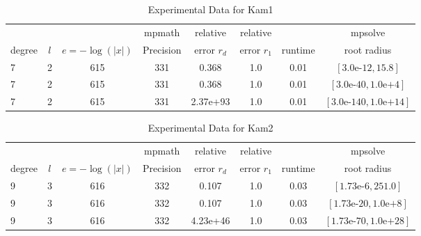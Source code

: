 \documentclass[sigconf]{acmart}
\begin{document}
\begin{table}[t]
\caption{Experimental Data for Kam1}
\label{tab:kam1}
\vskip -0.15in
\begin{center}
\begin{small}
\begin{sc}
\begin{tabular}{lccccccc}
\toprule
&  &  & mpmath & relative  & relative &  & mpsolve \\
degree  & $l$& $e=-\log(|x|)$& Precision &error $r_d$       & error $r_1$ &runtime& root radius\\
\midrule
 7 & 2 & 615 & 331 & 0.368 & 1.0 & 0.01 & $[3.0\text{e-}12, 15.8]$\\
 7 & 2 & 615 & 331 & 0.368 & 1.0 & 0.01 & $[3.0\text{e-}40, 1.0\text{e+}4]$\\
 7 & 2 & 615 & 331 & 2.37e+93 & 1.0 & 0.01 & $[3.0\text{e-}140, 1.0\text{e+}14]$\\
\bottomrule
\end{tabular}
\end{sc}
\end{small}
\end{center}
\vskip 0.05in
\end{table}

\begin{table}[t]
\caption{Experimental Data for Kam2}
\label{tab:kam2}
\vskip -0.15in
\begin{center}
\begin{small}
\begin{sc}
\begin{tabular}{lccccccc}
\toprule
&  &  & mpmath & relative  & relative &  & mpsolve \\
degree  & $l$& $e=-\log(|x|)$& Precision &error $r_d$       & error $r_1$ &runtime& root radius\\
\midrule
 9 & 3 & 616 & 332 & 0.107 & 1.0 & 0.03 & $[1.73\text{e-}6, 251.0]$\\
 9 & 3 & 616 & 332 & 0.107 & 1.0 & 0.03 & $[1.73\text{e-}20, 1.0\text{e+}8]$\\
 9 & 3 & 616 & 332 & 4.23e+46 & 1.0 & 0.03 & $[1.73\text{e-}70, 1.0\text{e+}28]$\\
\bottomrule
\end{tabular}
\end{sc}
\end{small}
\end{center}
\vskip 0.05in
\end{table}
\end{document}
